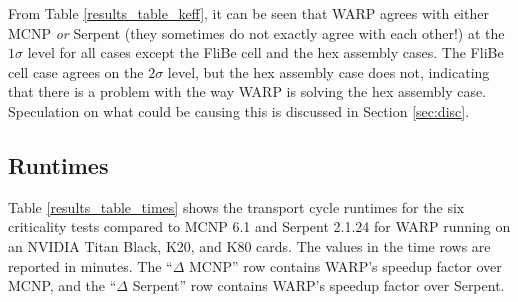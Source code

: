 \documentclass[preprint,12pt]{elsarticle}
\begin{document}
From Table \ref{results_table_keff}, it can be seen that WARP agrees with either MCNP \emph{or} Serpent (they sometimes do not exactly agree with each other!) at the $1\sigma$ level for all cases except the FliBe cell and the hex assembly cases.  The FliBe cell case agrees on the $2\sigma$ level, but the hex assembly case does not, indicating that there is a problem with the way WARP is solving the hex assembly case.  Speculation on what could be causing this is discussed in Section \ref{sec:disc}.


\subsection{Runtimes}
Table \ref{results_table_times} shows the transport cycle runtimes for the six criticality tests compared to MCNP 6.1 and Serpent 2.1.24 for WARP running on an NVIDIA Titan Black, K20, and K80 cards.  The values in the time rows are reported in minutes.  The ``$\Delta$ MCNP'' row contains WARP's speedup factor over MCNP, and the ``$\Delta$ Serpent'' row contains WARP's speedup factor over Serpent.
\end{document}
